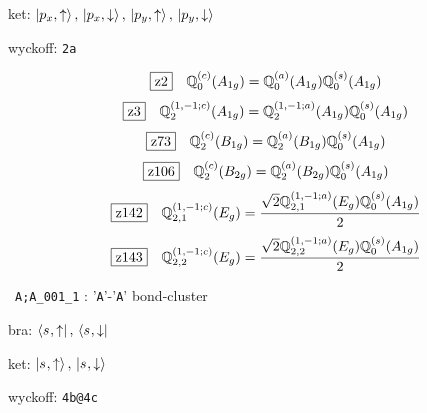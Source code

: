 \documentclass[fleqn,10pt,landscape]{jsarticle}
\begin{document}
\noindent\quad * ket: $\ket{p_{x},\uparrow},\, \ket{p_{x},\downarrow},\, \ket{p_{y},\uparrow},\, \ket{p_{y},\downarrow}$

\noindent\quad * wyckoff: \texttt{2a}

\begin{dmath*}
\hspace*{3mm}\fbox{z2}\quad \mathbb{Q}_{0}^{(c)}(A_{1g})=\mathbb{Q}_{0}^{(a)}(A_{1g}) \mathbb{Q}_{0}^{(s)}(A_{1g})
\end{dmath*}
\begin{dmath*}
\hspace*{3mm}\fbox{z3}\quad \mathbb{Q}_{2}^{(1,-1;c)}(A_{1g})=\mathbb{Q}_{2}^{(1,-1;a)}(A_{1g}) \mathbb{Q}_{0}^{(s)}(A_{1g})
\end{dmath*}
\begin{dmath*}
\hspace*{3mm}\fbox{z73}\quad \mathbb{Q}_{2}^{(c)}(B_{1g})=\mathbb{Q}_{2}^{(a)}(B_{1g}) \mathbb{Q}_{0}^{(s)}(A_{1g})
\end{dmath*}
\begin{dmath*}
\hspace*{3mm}\fbox{z106}\quad \mathbb{Q}_{2}^{(c)}(B_{2g})=\mathbb{Q}_{2}^{(a)}(B_{2g}) \mathbb{Q}_{0}^{(s)}(A_{1g})
\end{dmath*}
\begin{dmath*}
\hspace*{3mm}\fbox{z142}\quad \mathbb{Q}_{2,1}^{(1,-1;c)}(E_{g})=\frac{\sqrt{2} \mathbb{Q}_{2,1}^{(1,-1;a)}(E_{g}) \mathbb{Q}_{0}^{(s)}(A_{1g})}{2}
\end{dmath*}
\begin{dmath*}
\hspace*{3mm}\fbox{z143}\quad \mathbb{Q}_{2,2}^{(1,-1;c)}(E_{g})=\frac{\sqrt{2} \mathbb{Q}_{2,2}^{(1,-1;a)}(E_{g}) \mathbb{Q}_{0}^{(s)}(A_{1g})}{2}
\end{dmath*}
\vspace{5mm}

\noindent\textbullet\, \texttt{A;A_001_1} : '\texttt{A}'-'\texttt{A}' bond-cluster

\noindent\quad * bra: $\bra{s_{},\uparrow},\, \bra{s_{},\downarrow}$

\noindent\quad * ket: $\ket{s_{},\uparrow},\, \ket{s_{},\downarrow}$

\noindent\quad * wyckoff: \texttt{4b@4c}
\end{document}

